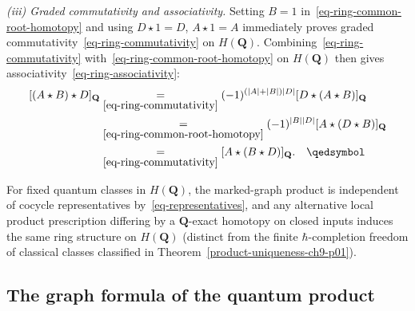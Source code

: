 \documentclass[11pt]{article}
\numberwithin{equation}{section}
\numberwithin{figure}{section}
\numberwithin{table}{section}
\begin{document}
\begin{proofbox}
\emph{(iii) Graded commutativity and associativity.} Setting $B=1$ in~\eqref{eq-ring-common-root-homotopy} and using $D\star1=D$, $A\star1=A$ immediately proves graded commutativity~\eqref{eq-ring-commutativity} on $H(\mathbf Q)$. Combining~\eqref{eq-ring-commutativity} with~\eqref{eq-ring-common-root-homotopy} on $H(\mathbf Q)$ then gives associativity~\eqref{eq-ring-associativity}:
\begin{equation}\label{eq-ring-associativity-proof}
\begin{aligned}
[(A\star B)\star D]_{\mathbf Q}
&\underset{\eqref{eq-ring-commutativity}}{=}(-1)^{(|A|+|B|)|D|}[D\star(A\star B)]_{\mathbf Q}\\
&\underset{\eqref{eq-ring-common-root-homotopy}}{=}(-1)^{|B||D|}[A\star(D\star B)]_{\mathbf Q}\\
&\underset{\eqref{eq-ring-commutativity}}{=}[A\star(B\star D)]_{\mathbf Q}.\quad\qedsymbol
\end{aligned}
\end{equation}
\end{proofbox}

For fixed quantum classes in $H(\mathbf Q)$, the marked-graph product is independent of cocycle representatives by~\eqref{eq-representatives}, and any alternative local product prescription differing by a $\mathbf Q$-exact homotopy on closed inputs induces the same ring structure on $H(\mathbf Q)$ (distinct from the finite $\hbar$-completion freedom of classical classes classified in Theorem~\ref{product-uniqueness-ch9-p01}).

\subsection{The graph formula of the quantum product}\label{the-graph-formula}
\end{document}
